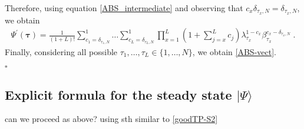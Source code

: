 \documentclass[10pt]{article}
\numberwithin{equation}{section}
\numberwithin{equation}{subsection}
\newcommand{\dt}{\;.}
\begin{document}
Therefore, using equation \eqref{ABS_intermediate} and observing that $c_{x}\delta_{\tau_{x},N} =\delta_{\tau_{x},N}$, we obtain 
\begin{equation}\label{elementsABS}
	\begin{split}
		\Psi^{'}(\bm{\tau})=\frac{1}{(1+L)!}\sum_{c_{1}=\delta_{\tau_{1},N}}^{1}\ldots\sum_{c_{L}=\delta_{\tau_{L},N}}^{1}\prod_{x=1}^{L}\left(1+\sum_{j=x}^{L}c_{j}\right)\lambda_{\tau_{x}}^{1-c_{x}}\beta_{\tau_{x}}^{c_{x}-\delta_{\tau_{x},N}}\dt
	\end{split}
\end{equation} 
Finally, considering all possible $\tau_{1},\ldots,\tau_{L}\in \{1,\ldots,N\}$, we obtain \eqref{ABS-vect}.
\begin{flushright}
    $\square$
\end{flushright}

\subsection{Explicit formula for the steady state $|\Psi\rangle$}
{\color{blue}can we proceed as above? using sth similar to \eqref{goodTP-S2}}
\end{document}
